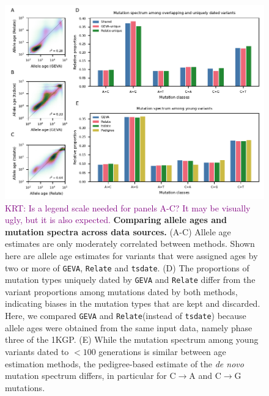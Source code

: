 \documentclass[]{article}
\newcommand{\krtcomment}[1]{{\textcolor{purple}{KRT: #1}}}
\newcommand{\GEVA}{\texttt{GEVA}\xspace}
\newcommand{\tsdate}{\texttt{tsdate}\xspace}
\newcommand{\relate}{\texttt{Relate}\xspace}
\begin{document}
\begin{figure}[t!]
    \centering
    \includegraphics{../plots/fig2.pdf}
    \caption{
        \krtcomment{Is a legend scale needed for panels A-C? It may be
        visually ugly, but it is also expected.}
        \textbf{Comparing allele ages and mutation spectra across data
        sources.} (A-C) Allele age estimates are only moderately correlated
        between methods. Shown here are allele age estimates for variants that
        were assigned ages by two or more of \GEVA, \relate and \tsdate. (D)
        The proportions of mutation types uniquely dated by \GEVA and \relate
        differ from the variant proportions among mutations dated by both
        methods, indicating biases in the mutation types that are kept and
        discarded. Here, we compared \GEVA and \relate (instead of \tsdate)
        because allele ages were obtained from the same input data, namely
        phase three of the 1KGP.
        (E) While the mutation spectrum among young variants dated
        to $<100$ generations is similar between age estimation methods,
        the pedigree-based estimate of the \emph{de novo} mutation spectrum
        \citep{jonsson2017parental} differs, in particular for C$\rightarrow$A
        and C$\rightarrow$G mutations.
    }
    \label{fig:data-comp}
\end{figure}
\end{document}
